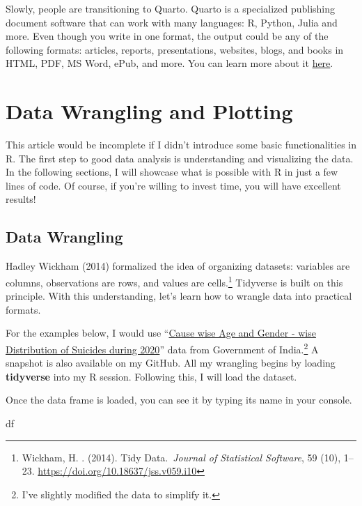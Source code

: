 \documentclass[
  letterpaper,
  DIV=11,
  numbers=noendperiod]{scrartcl}
\newenvironment{Shaded}{\begin{snugshade}}{\end{snugshade}}
\newcommand{\NormalTok}[1]{\textcolor[rgb]{0.00,0.23,0.31}{#1}}
\begin{document}
Slowly, people are transitioning to Quarto. Quarto is a specialized
publishing document software that can work with many languages: R,
Python, Julia and more. Even though you write in one format, the output
could be any of the following formats: articles, reports, presentations,
websites, blogs, and books in HTML, PDF, MS Word, ePub, and more. You
can learn more about it \href{https://quarto.org}{here}.

\hypertarget{data-wrangling-and-plotting}{%
\section{Data Wrangling and
Plotting}\label{data-wrangling-and-plotting}}

This article would be incomplete if I didn't introduce some basic
functionalities in R. The first step to good data analysis is
understanding and visualizing the data. In the following sections, I
will showcase what is possible with R in just a few lines of code. Of
course, if you're willing to invest time, you will have excellent
results!

\hypertarget{data-wrangling}{%
\subsection{Data Wrangling}\label{data-wrangling}}

Hadley Wickham (2014) formalized the idea of organizing datasets:
variables are columns, observations are rows, and values are
cells.\footnote{Wickham, H. . (2014). Tidy Data.~\emph{Journal of
  Statistical Software}, 59 (10), 1--23.
  \url{https://doi.org/10.18637/jss.v059.i10}} Tidyverse is built on
this principle. With this understanding, let's learn how to wrangle data
into practical formats.

For the examples below, I would use
``\href{https://data.gov.in/resource/cause-wise-age-and-gender-wise-distribution-suicides-during-2020}{Cause
wise Age and Gender - wise Distribution of Suicides during 2020}'' data
from Government of India.\footnote{I've slightly modified the data to
  simplify it.} A snapshot is also available on my GitHub. All my
wrangling begins by loading \textbf{tidyverse} into my R session.
Following this, I will load the dataset.

Once the data frame is loaded, you can see it by typing its name in your
console.

\begin{Shaded}
\begin{Highlighting}[]
\NormalTok{df}
\end{Highlighting}
\end{Shaded}
\end{document}
